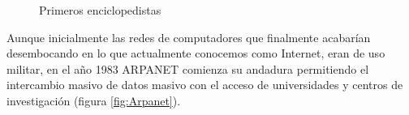 
\begin{figure}[hbtp]
	\begin{adjustbox}{minipage=\linewidth, fbox}
		\centering
		\hspace{20mm}
		\label{fig:Introduccion_enciclopedistas}
	\end{adjustbox}
\caption{Primeros enciclopedistas}
\end{figure}

Aunque inicialmente las redes de computadores que finalmente acabarían desembocando en lo que actualmente conocemos como Internet, eran de uso militar, en el año 1983 ARPANET comienza su andadura permitiendo el intercambio masivo de datos masivo con el acceso de universidades y centros de investigación (figura \ref{fig:Arpanet}).%

